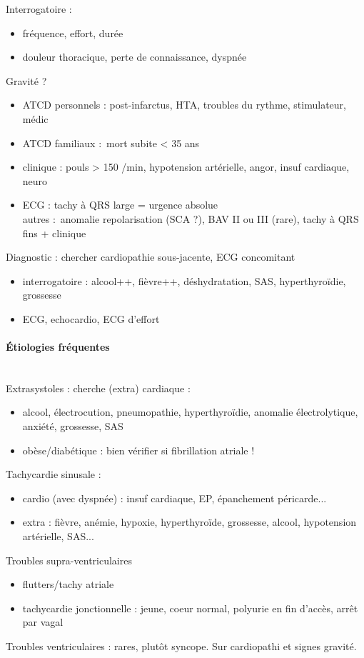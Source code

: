 \documentclass{article}
\begin{document}
Interrogatoire : 
\begin{itemize}
  \item fréquence, effort, durée
  \item \danger{} douleur thoracique, perte de connaissance, dyspnée
\end{itemize}
Gravité ?
\begin{itemize}
  \item ATCD personnels : post-infarctus, HTA, troubles du rythme, stimulateur,
    médic
  \item ATCD familiaux : mort subite < 35 ans
  \item clinique : pouls > 150 /min, hypotension artérielle, angor, insuf
    cardiaque, neuro
  \item ECG : tachy à QRS large = urgence absolue \skull\\
    autres : anomalie repolarisation (SCA ?), BAV II ou III (rare), tachy à QRS
    fins + clinique
\end{itemize}
Diagnostic : chercher cardiopathie sous-jacente, ECG concomitant
\begin{itemize}
  \item interrogatoire : alcool++, fièvre++, déshydratation, SAS,
    hyperthyroïdie, grossesse
  \item ECG, echocardio, ECG d'effort
\end{itemize}

\paragraph{Étiologies fréquentes}\mbox{}\\
Extrasystoles : cherche (extra) cardiaque :
\begin{itemize}
  \item alcool, électrocution, pneumopathie, hyperthyroïdie, anomalie
    électrolytique, anxiété, grossesse, SAS
  \item \danger{} obèse/diabétique : bien vérifier si fibrillation atriale !
\end{itemize}
Tachycardie sinusale :
\begin{itemize}
  \item cardio (avec dyspnée) : insuf cardiaque, EP, épanchement péricarde...
  \item extra : fièvre, anémie, hypoxie, hyperthyroïde, grossesse, alcool,
    hypotension artérielle, SAS...
\end{itemize}
Troubles supra-ventriculaires
\begin{itemize}
  \item flutters/tachy atriale
  \item tachycardie jonctionnelle : jeune, coeur normal, polyurie en fin d'accès,
    arrêt par vagal
\end{itemize}
Troubles ventriculaires : rares, plutôt syncope. Sur cardiopathi et signes
gravité.
\end{document}
